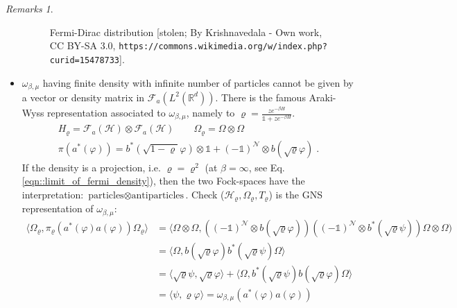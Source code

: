 \documentclass[
a4paper, %
11pt, %
onecolumn, %
openany, %
]{memoir}
\theoremstyle{definition}
\theoremstyle{remark}
\newtheorem{remarks}[definition]{Remarks}
\theoremstyle{plain}
\begin{document}
\begin{remarks}
\begin{itemize}
\begin{figure}
		 	\caption{Fermi-Dirac distribution [stolen; By Krishnavedala - Own work, CC BY-SA 3.0, \texttt{https://commons.wikimedia.org/w/index.php?curid=15478733}]\label{fermidirac}.}
		 \end{figure}
	 \item $\omega_{\beta,\mu}$ having finite density with infinite number of particles cannot be given by a vector or density matrix in $\mathcal{F}_a(L^2(\mathbb{R}^d))$. There is the famous Araki-Wyss representation associated to $\omega_{\beta,\mu}$, namely to $\varrho=\frac{ze^{-\beta H}}{\mathds{1}+ze^{-\beta H}}$. \begin{align}
	 H_{\varrho}=\mathcal{F}_a (\mathcal{H}) \otimes \mathcal{F}_a(\mathcal{H}) \qquad \Omega_{\varrho}=\Omega\otimes\Omega \\
	 \pi(a^*(\varphi))=b^*(\sqrt{1-\varrho}\varphi)\otimes \mathds{1}+(-\mathds{1})^{\mathcal{N}}\otimes b(\sqrt{\varrho}\varphi)\; .
	 \end{align}
	 If the density is a projection, i.e. $\varrho=\varrho^2$ (at $\beta=\infty$, see Eq. \eqref{eqn::limit_of_fermi_density}), then the two Fock-spaces have the interpretation: $\text{particles}\otimes\text{antiparticles}$. Check ($\mathcal{H}_\varrho,\Omega_{\varrho},T_{\varrho}$) is the GNS representation of $\omega_{\beta,\mu}$: \begin{align}
	 \langle \Omega_{\varrho},\pi_{\varrho}(a^*(\varphi)a(\varphi))\Omega_{\varrho}\rangle&=\langle \Omega\otimes \Omega,\left((-\mathds{1})^{\mathcal{N}}\otimes b(\sqrt{\varrho}\varphi)\right)\left((-\mathds{1})^{\mathcal{N}}\otimes b^*(\sqrt{\varrho}\psi)\right)\Omega\otimes \Omega)\\
	 &=\langle \Omega,b(\sqrt{\varrho}\varphi)b^*(\sqrt{\varrho}\psi)\Omega\rangle\\
	 &=\langle \sqrt{\varrho}\psi,\sqrt{\varrho}\varphi\rangle+\langle \Omega ,b^*(\sqrt{\varrho}\psi)b(\sqrt{\varrho}\varphi)\Omega\rangle\\
	 &=\langle \psi,\varrho\varphi\rangle=\omega_{\beta,\mu}(a^*(\varphi)a(\varphi))
	 \end{align}
	\end{itemize}
\end{remarks}
\end{document}
